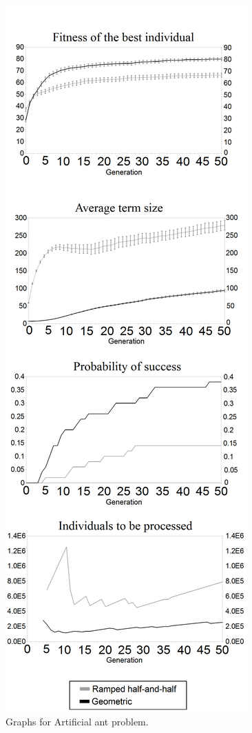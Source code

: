 \documentclass[conference]{IEEEtran}
\begin{document}
\begin{figure}[h!]
  \centering
  \caption{Graphs for Artificial ant problem.}
  \includegraphics[scale=0.26]{imgs/cec/ANTb.PNG}
\end{figure}
\end{document}
